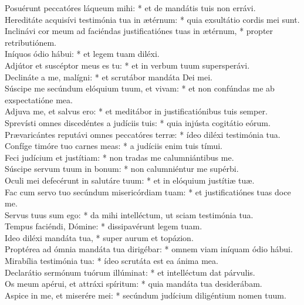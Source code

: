 {	Posuérunt peccatóres láqueum mihi: * et de mandátis tuis non errávi. \\
	Hereditáte acquisívi testimónia tua in ætérnum: * quia exsultátio cordis mei sunt. \\
	Inclinávi cor meum ad faciéndas justificatiónes tuas in ætérnum, * propter retributiónem. \\
	Iníquos ódio hábui: * et legem tuam diléxi. \\
	Adjútor et suscéptor meus es tu: * et in verbum tuum supersperávi. \\
	Declináte a me, malígni: * et scrutábor mandáta Dei mei. \\
	Súscipe me secúndum elóquium tuum, et vivam: * et non confúndas me ab exspectatióne mea. \\
	Adjuva me, et salvus ero: * et meditábor in justificatiónibus tuis semper. \\
	Sprevísti omnes discedéntes a judíciis tuis: * quia injústa cogitátio eórum. \\
	Prævaricántes reputávi omnes peccatóres terræ: * ídeo diléxi testimónia tua. \\
	Confíge timóre tuo carnes meas: * a judíciis enim tuis tímui. \\
	Feci judícium et justítiam: * non tradas me calumniántibus me. \\
	Súscipe servum tuum in bonum: * non calumniéntur me supérbi. \\
	Oculi mei defecérunt in salutáre tuum: * et in elóquium justítiæ tuæ. \\
	Fac cum servo tuo secúndum misericórdiam tuam: * et justificatiónes tuas doce me. \\
	Servus tuus sum ego: * da mihi intelléctum, ut sciam testimónia tua. \\
	Tempus faciéndi, Dómine: * dissipavérunt legem tuam. \\
	Ideo diléxi mandáta tua, * super aurum et topázion. \\
	Proptérea ad ómnia mandáta tua dirigébar: * omnem viam iníquam ódio hábui. \\
	Mirabília testimónia tua: * ídeo scrutáta est ea ánima mea. \\
	Declarátio sermónum tuórum illúminat: * et intelléctum dat párvulis. \\
	Os meum apérui, et attráxi spíritum: * quia mandáta tua desiderábam. \\
	Aspice in me, et miserére mei: * secúndum judícium diligéntium nomen tuum. \\
}
